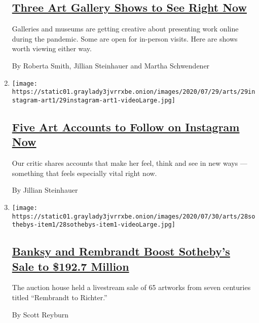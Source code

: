 \begin{enumerate}
{  \subsection{\texorpdfstring{\href{/2020/07/30/arts/design/virtual-art-gallery-shows.html}{Three
  Art Gallery Shows to See Right
  Now}}{Three Art Gallery Shows to See Right Now}}\label{three-art-gallery-shows-to-see-right-now}}

  Galleries and museums are getting creative about presenting work
  online during the pandemic. Some are open for in-person visits. Here
  are shows worth viewing either way.

  By Roberta Smith, Jillian Steinhauer and Martha Schwendener
\item
  \texttt{[image: https://static01.graylady3jvrrxbe.onion/images/2020/07/29/arts/29instagram-art1/29instagram-art1-videoLarge.jpg]}

  \hypertarget{five-art-accounts-to-follow-on-instagram-now}{%
  \subsection{\texorpdfstring{\href{/2020/07/29/arts/design/art-accounts-to-follow-instagram.html}{Five
  Art Accounts to Follow on Instagram
  Now}}{Five Art Accounts to Follow on Instagram Now}}\label{five-art-accounts-to-follow-on-instagram-now}}

  Our critic shares accounts that make her feel, think and see in new
  ways --- something that feels especially vital right now.

  By Jillian Steinhauer
\item
  \texttt{[image: https://static01.graylady3jvrrxbe.onion/images/2020/07/30/arts/28sothebys-item1/28sothebys-item1-videoLarge.jpg]}

  \hypertarget{banksy-and-rembrandt-boost-sothebys-sale-to-1927-million}{%
  \subsection{\texorpdfstring{\href{/2020/07/28/arts/design/sothebys-banksy-rembrandt.html}{Banksy
  and Rembrandt Boost Sotheby's Sale to \$192.7
  Million}}{Banksy and Rembrandt Boost Sotheby's Sale to \$192.7 Million}}\label{banksy-and-rembrandt-boost-sothebys-sale-to-1927-million}}

  The auction house held a livestream sale of 65 artworks from seven
  centuries titled ``Rembrandt to Richter.''

  By Scott Reyburn
\end{enumerate}

